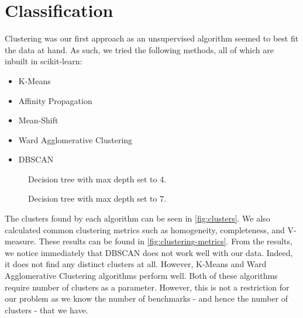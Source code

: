 \section{Classification} \label{sec:classfication}

Clustering was our first approach as an unsupervised algorithm seemed
to best fit the data at hand. As such, we tried the following methods,
all of which are inbuilt in scikit-learn:\\

\begin{itemize}
\item K-Means
\item Affinity Propagation
\item Mean-Shift
\item Ward Agglomerative Clustering
\item DBSCAN
\end{itemize}

\begin{figure}[h!]
    \centering
    \caption{Decision tree with max depth set to 4.}
    \label{fig:tree_4}
\end{figure}

\begin{figure}[h!]
    \centering
    \caption{Decision tree with max depth set to 7.}
    \label{fig:tree_7}
\end{figure}

The clusters found by each algorithm can be seen in
\cref{fig:clusters}. We also calculated common clustering metrics such
as homogeneity, completeness, and V-measure. These results can be
found in \cref{fig:clustering-metrics}. From the results, we notice
immediately that DBSCAN does not work well with our data. Indeed, it
does not find any distinct clusters at all. However, K-Means and Ward
Agglomerative Clustering algorithms perform well. 
Both of these algorithms require number of clusters as a 
parameter. 
However, this is not a restriction for our problem as we
know the number of benchmarks - and hence the number of clusters -
that we have.

